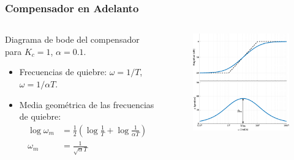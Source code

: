 \documentclass[aspectratio=169, handout]{beamer}
\theoremstyle{definition}
\theoremstyle{plain}
\theoremstyle{remark}
\begin{document}
\begin{frame}[<+->]\frametitle{Compensador en Adelanto}
\begin{columns}
	\begin{column}{0.5\textwidth}
	Diagrama de bode del compensador para $K_c=1$, $\alpha=0.1$.
	\begin{itemize}
		\item Frecuencias de quiebre: $\omega = 1/T$, $\omega = 1/\alpha T$.
		\item Media geométrica de las frecuencias de quiebre:
		\begin{align*}
			\log \omega_m &=\frac{1}{2}\left( \log \frac{1}{T} + \log \frac{1}{\alpha T} \right)\\
			\omega_m &= \frac{1}{\sqrt{\alpha}T}
		\end{align*}
	\end{itemize}
	\end{column}
	\begin{column}{0.5\textwidth}
	\begin{figure}
		\centering
		\includegraphics[width=7cm]{images/bodeLeadComp.eps}
	\end{figure}
	\end{column}
\end{columns}
\end{frame}
\end{document}
